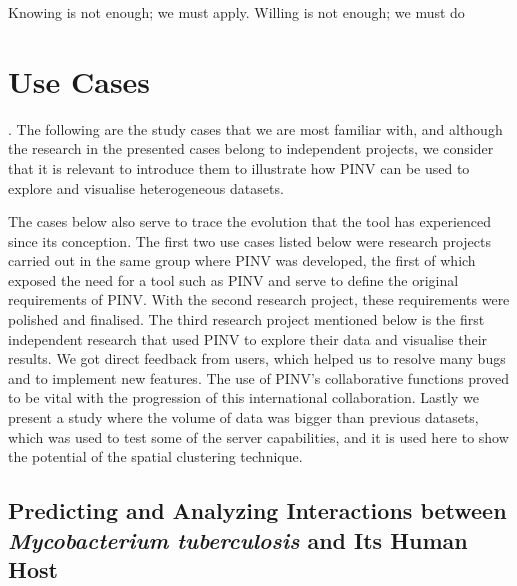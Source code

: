 \begin{savequote}[75mm] 
Knowing is not enough; we must apply. Willing is not enough; we must do
\end{savequote}

\chapter{Use Cases} \label{section:use_cases}

. The following are the study cases that we are most familiar with, and although the research in the presented cases belong to independent projects, we consider that it is relevant to introduce them to illustrate how PINV can be used to explore and visualise heterogeneous datasets. 

The cases below also serve to trace the evolution that the tool has experienced since its conception. The first two use cases listed below were research projects carried out in the same group where PINV was developed, the first of which exposed the need for a tool such as PINV and serve to define the original requirements of PINV. With the second research project, these requirements were polished and finalised.  The third research project mentioned below is the first independent research that used PINV to explore their data and visualise their results. We got direct feedback from users, which helped us to resolve many bugs and to implement new features. The use of PINV's collaborative functions proved to be vital with the progression of this international collaboration. Lastly we present a study where the volume of data was bigger than previous datasets, which was used to test some of the server capabilities, and it is used here to show the potential of the spatial clustering technique.

\section{Predicting and Analyzing Interactions between \emph{Mycobacterium tuberculosis} and Its Human Host} \label{sec:mb_human}

